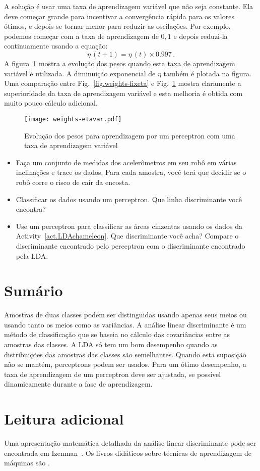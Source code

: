 A solução é usar uma taxa de aprendizagem variável que não seja constante. Ela deve começar grande para incentivar a convergência rápida para os valores ótimos, e depois se tornar menor para reduzir as oscilações. Por exemplo, podemos começar com a taxa de aprendizagem de $0,1$ e depois reduzi-la continuamente usando a equação:
\[
\eta\,(t+1) = \eta\,(t) \times 0.997\,.
\]
A figura~\ref{fig.perceptron-dis-etavar} mostra a evolução dos pesos quando esta taxa de aprendizagem variável é utilizada. A diminuição exponencial de $\eta$ também é plotada na figura. Uma comparação entre Fig.~\ref{fig.weights-fixeta} e Fig.~\ref{fig.perceptron-dis-etavar} mostra claramente a superioridade da taxa de aprendizagem variável e esta melhoria é obtida com muito pouco cálculo adicional.
\begin{figure}
\begin{center}
\texttt{[image: weights-etavar.pdf]}
\end{center}
\caption{Evolução dos pesos para aprendizagem por um perceptron com uma taxa de aprendizagem variável}\label{fig.perceptron-dis-etavar}
\end{figure}

\begin{framed}
\begin{itemize}
\item Faça um conjunto de medidas dos acelerômetros em seu robô em várias inclinações e trace os dados. Para cada amostra, você terá que decidir se o robô corre o risco de cair da encosta.
\item Classificar os dados usando um perceptron. Que linha discriminante você encontra?
\item Use um perceptron para classificar as áreas cinzentas usando os dados da Activity~\ref{act.LDAchameleon}. Que discriminante você acha? Compare o discriminante encontrado pelo perceptron com o discriminante encontrado pela LDA.
\end{itemize}
\end{framed}

\section{Sumário}

Amostras de duas classes podem ser distinguidas usando apenas seus meios ou usando tanto os meios como as variâncias. A análise linear discriminante é um método de classificação que se baseia no cálculo das covariâncias entre as amostras das classes. A LDA só tem um bom desempenho quando as distribuições das amostras das classes são semelhantes. Quando esta suposição não se mantém, perceptrons podem ser usados. Para um ótimo desempenho, a taxa de aprendizagem de um perceptron deve ser ajustada, se possível dinamicamente durante a fase de aprendizagem.

\section{Leitura adicional}

Uma apresentação matemática detalhada da análise linear discriminante pode ser encontrada em Izenman~\cite[Chapter~8]{izenman2008}. Os livros didáticos sobre técnicas de aprendizagem de máquinas são \cite{harrington2012machine, kubat2015machinelearning}.
